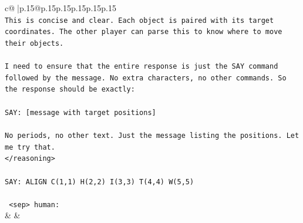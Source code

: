 \documentclass{article}
\begin{document}
{\begin{supertabular}{c@{$\;$}|p{.15\linewidth}@{}p{.15\linewidth}p{.15\linewidth}p{.15\linewidth}p{.15\linewidth}p{.15\linewidth}}
{{{\\ 
\texttt{This is concise and clear. Each object is paired with its target coordinates. The other player can parse this to know where to move their objects.} \\
\\ 
\texttt{I need to ensure that the entire response is just the SAY command followed by the message. No extra characters, no other commands. So the response should be exactly:} \\
\\ 
\texttt{SAY: {[}message with target positions{]}} \\
\\ 
\texttt{No periods, no other text. Just the message listing the positions. Let me try that.} \\
\texttt{</reasoning>} \\
\\ 
\texttt{SAY: ALIGN C(1,1) H(2,2) I(3,3) T(4,4) W(5,5)} \\
\\ 
\texttt{ <sep> human:} \\
            }
        }
    }
    & & \\ \\


\end{supertabular}}
\end{document}
